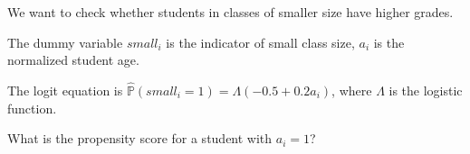 
\begin{question}
We want to check whether students in classes of smaller size have higher grades.

The dummy variable \(small_i\) is the indicator of small class size, \(a_i\) is the normalized student age.

The logit equation is \(\hat{\mathbb{P}}(small_i = 1) = \Lambda(-0.5 + 0.2 a_i)\), where \(\Lambda\) is the logistic function.

What is the propensity score for a student with \(a_i = 1\)?
\end{question}


